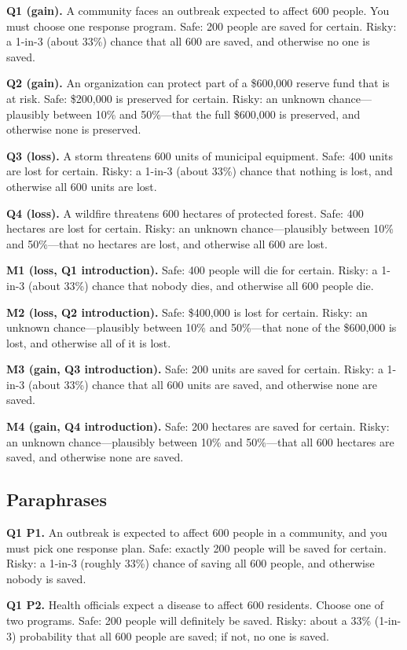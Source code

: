 \documentclass[11pt]{article}
\begin{document}
\textbf{Q1 (gain).} A community faces an outbreak expected to affect 600 people. You must choose one response program. Safe: 200 people are saved for certain. Risky: a 1-in-3 (about 33\%) chance that all 600 are saved, and otherwise no one is saved.

\textbf{Q2 (gain).} An organization can protect part of a \$600,000 reserve fund that is at risk. Safe: \$200,000 is preserved for certain. Risky: an unknown chance---plausibly between 10\% and 50\%---that the full \$600,000 is preserved, and otherwise none is preserved.

\textbf{Q3 (loss).} A storm threatens 600 units of municipal equipment. Safe: 400 units are lost for certain. Risky: a 1-in-3 (about 33\%) chance that nothing is lost, and otherwise all 600 units are lost.

\textbf{Q4 (loss).} A wildfire threatens 600 hectares of protected forest. Safe: 400 hectares are lost for certain. Risky: an unknown chance---plausibly between 10\% and 50\%---that no hectares are lost, and otherwise all 600 are lost.

\textbf{M1 (loss, Q1 introduction).} Safe: 400 people will die for certain. Risky: a 1-in-3 (about 33\%) chance that nobody dies, and otherwise all 600 people die.

\textbf{M2 (loss, Q2 introduction).} Safe: \$400,000 is lost for certain. Risky: an unknown chance---plausibly between 10\% and 50\%---that none of the \$600,000 is lost, and otherwise all of it is lost.

\textbf{M3 (gain, Q3 introduction).} Safe: 200 units are saved for certain. Risky: a 1-in-3 (about 33\%) chance that all 600 units are saved, and otherwise none are saved.

\textbf{M4 (gain, Q4 introduction).} Safe: 200 hectares are saved for certain. Risky: an unknown chance---plausibly between 10\% and 50\%---that all 600 hectares are saved, and otherwise none are saved.

\subsection{Paraphrases}

\textbf{Q1 P1.} An outbreak is expected to affect 600 people in a community, and you must pick one response plan. Safe: exactly 200 people will be saved for certain. Risky: a 1-in-3 (roughly 33\%) chance of saving all 600 people, and otherwise nobody is saved.

\textbf{Q1 P2.} Health officials expect a disease to affect 600 residents. Choose one of two programs. Safe: 200 people will definitely be saved. Risky: about a 33\% (1-in-3) probability that all 600 people are saved; if not, no one is saved.
\end{document}
